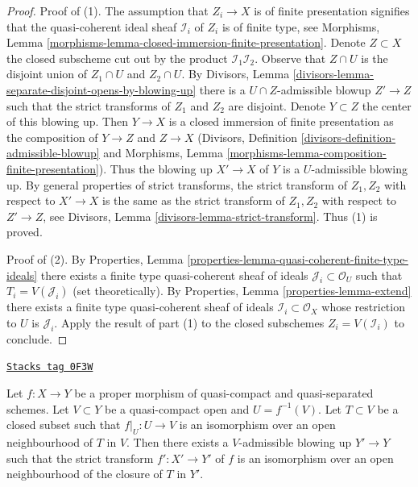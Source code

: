 \begin{proof}
Proof of (1). The assumption that $Z_i \to X$ is of finite presentation
signifies that the quasi-coherent ideal sheaf $\mathcal{I}_i$ of $Z_i$
is of finite type, see
Morphisms, Lemma \ref{morphisms-lemma-closed-immersion-finite-presentation}.
Denote $Z \subset X$ the closed subscheme
cut out by the product $\mathcal{I}_1 \mathcal{I}_2$.
Observe that $Z \cap U$ is the disjoint union
of $Z_1 \cap U$ and $Z_2 \cap U$. By Divisors, Lemma
\ref{divisors-lemma-separate-disjoint-opens-by-blowing-up}
there is a $U \cap Z$-admissible blowup $Z' \to Z$ such that
the strict transforms of $Z_1$ and $Z_2$ are disjoint.
Denote $Y \subset Z$ the center of this blowing up.
Then $Y \to X$ is a closed immersion of finite presentation as the composition
of $Y \to Z$ and $Z \to X$ (Divisors, Definition
\ref{divisors-definition-admissible-blowup}
and Morphisms, Lemma \ref{morphisms-lemma-composition-finite-presentation}).
Thus the blowing up $X' \to X$ of $Y$ is a $U$-admissible blowing
up. By general properties of strict transforms, the
strict transform of $Z_1, Z_2$ with respect to $X' \to X$
is the same as the strict transform of $Z_1, Z_2$ with respect
to $Z' \to Z$, see
Divisors, Lemma \ref{divisors-lemma-strict-transform}.
Thus (1) is proved.

\medskip\noindent
Proof of (2). By Properties, Lemma
\ref{properties-lemma-quasi-coherent-finite-type-ideals}
there exists a finite type quasi-coherent sheaf of ideals
$\mathcal{J}_i \subset \mathcal{O}_U$ such that
$T_i = V(\mathcal{J}_i)$ (set theoretically).
By Properties, Lemma \ref{properties-lemma-extend}
there exists a finite type quasi-coherent sheaf
of ideals $\mathcal{I}_i \subset \mathcal{O}_X$
whose restriction to $U$ is $\mathcal{J}_i$.
Apply the result of part (1) to the closed
subschemes $Z_i = V(\mathcal{I}_i)$ to conclude.
\end{proof}

\begin{lemma}
\label{flat-lemma-blowup-iso-along}
\href{https://stacks.math.columbia.edu/tag/0F3W}{\texttt{Stacks tag 0F3W}}

Let $f : X \to Y$ be a proper morphism of quasi-compact and
quasi-separated schemes. Let $V \subset Y$ be a quasi-compact open
and $U = f^{-1}(V)$. Let $T \subset V$ be a closed subset such that
$f|_U : U \to V$ is an isomorphism over an open neighbourhood of $T$
in $V$. Then there exists a $V$-admissible blowing up $Y' \to Y$
such that the strict transform $f' : X' \to Y'$ of $f$
is an isomorphism over an open neighbourhood of the closure
of $T$ in $Y'$.
\end{lemma}


